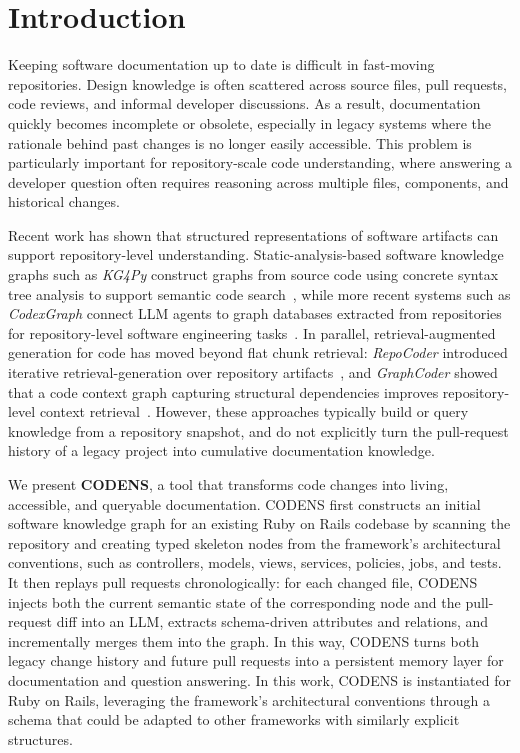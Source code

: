 \documentclass[sigconf]{acmart}
\begin{document}
\section{Introduction}

Keeping software documentation up to date is difficult in fast-moving repositories. 
Design knowledge is often scattered across source files, pull requests, code reviews, and informal developer discussions. 
As a result, documentation quickly becomes incomplete or obsolete, especially in legacy systems where the rationale behind past changes is no longer easily accessible. 
This problem is particularly important for repository-scale code understanding, where answering a developer question often requires reasoning across multiple files, components, and historical changes.

Recent work has shown that structured representations of software artifacts can support repository-level understanding. 
Static-analysis-based software knowledge graphs such as \emph{KG4Py} construct graphs from source code using concrete syntax tree analysis to support semantic code search~\cite{Liang2022KG4Py}, while more recent systems such as \emph{CodexGraph} connect LLM agents to graph databases extracted from repositories for repository-level software engineering tasks~\cite{Liu2025CodexGraph}. 
In parallel, retrieval-augmented generation for code has moved beyond flat chunk retrieval: \emph{RepoCoder} introduced iterative retrieval-generation over repository artifacts~\cite{Zhang2023RepoCoder}, and \emph{GraphCoder} showed that a code context graph capturing structural dependencies improves repository-level context retrieval~\cite{Liu2024GraphCoder}. 
However, these approaches typically build or query knowledge from a repository snapshot, and do not explicitly turn the pull-request history of a legacy project into cumulative documentation knowledge.

We present \textbf{CODENS}, a tool that transforms code changes into living, accessible, and queryable documentation. 
CODENS first constructs an initial software knowledge graph for an existing Ruby on Rails codebase by scanning the repository and creating typed skeleton nodes from the framework's architectural conventions, such as controllers, models, views, services, policies, jobs, and tests. 
It then replays pull requests chronologically: for each changed file, CODENS injects both the current semantic state of the corresponding node and the pull-request diff into an LLM, extracts schema-driven attributes and relations, and incrementally merges them into the graph. 
In this way, CODENS turns both legacy change history and future pull requests into a persistent memory layer for documentation and question answering. 
In this work, CODENS is instantiated for Ruby on Rails, leveraging the framework's architectural conventions through a schema that could be adapted to other frameworks with similarly explicit structures.
\end{document}
